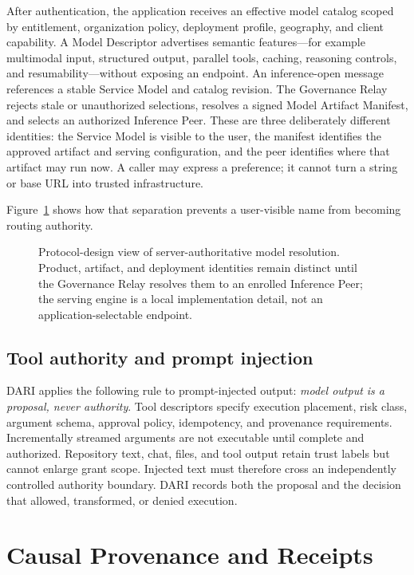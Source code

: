 \documentclass[10pt]{article}
\begin{document}
After authentication, the application receives an effective model catalog scoped by entitlement, organization policy, deployment profile, geography, and client capability. A Model Descriptor advertises semantic features---for example multimodal input, structured output, parallel tools, caching, reasoning controls, and resumability---without exposing an endpoint. An inference-open message references a stable Service Model and catalog revision. The Governance Relay rejects stale or unauthorized selections, resolves a signed Model Artifact Manifest, and selects an authorized Inference Peer. These are three deliberately different identities: the Service Model is visible to the user, the manifest identifies the approved artifact and serving configuration, and the peer identifies where that artifact may run now. A caller may express a preference; it cannot turn a string or base URL into trusted infrastructure.

Figure~\ref{fig:model-identity} shows how that separation prevents a user-visible name from becoming routing authority.

\begin{figure}[H]
  \centering
  
  \caption{Protocol-design view of server-authoritative model resolution. Product, artifact, and deployment identities remain distinct until the Governance Relay resolves them to an enrolled Inference Peer; the serving engine is a local implementation detail, not an application-selectable endpoint.}
  \label{fig:model-identity}
\end{figure}

\subsection{Tool authority and prompt injection}

DARI applies the following rule to prompt-injected output: \emph{model output is a proposal, never authority}. Tool descriptors specify execution placement, risk class, argument schema, approval policy, idempotency, and provenance requirements. Incrementally streamed arguments are not executable until complete and authorized. Repository text, chat, files, and tool output retain trust labels but cannot enlarge grant scope. Injected text must therefore cross an independently controlled authority boundary. DARI records both the proposal and the decision that allowed, transformed, or denied execution.

\section{Causal Provenance and Receipts}
\end{document}
